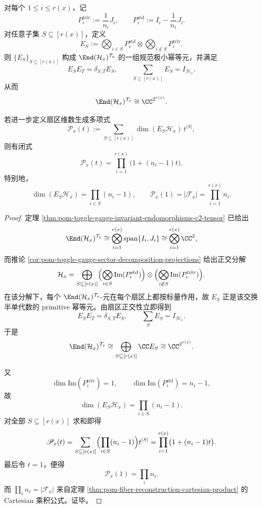 \begin{theorem}[开关不变代数的布尔谱与扇区维数多项式]\label{thm:conclusion-fiber-toggle-boolean-spectrum-polynomial}
对每个 \(1\le i\le r(x)\)，记
\[
P_i^{\mathrm{triv}}:=\frac{1}{n_i}J_i,
\qquad
P_i^{\mathrm{std}}:=I_i-\frac{1}{n_i}J_i.
\]
对任意子集 \(S\subseteq [r(x)]\)，定义
\[
E_S:=
\bigotimes_{i\in S}P_i^{\mathrm{std}}
\otimes
\bigotimes_{i\notin S}P_i^{\mathrm{triv}}.
\]
则 \(\{E_S\}_{S\subseteq[r(x)]}\) 构成 \(\End(\mathcal H_x)^{\mathcal T_x}\) 的一组规范极小幂等元，并满足
\[
E_SE_T=\delta_{S,T}E_S,
\qquad
\sum_{S\subseteq[r(x)]}E_S=I_{\mathcal H_x}.
\]
从而
\[
\End(\mathcal H_x)^{\mathcal T_x}\cong \CC^{2^{r(x)}}.
\]

若进一步定义扇区维数生成多项式
\[
\mathscr P_x(t):=\sum_{S\subseteq[r(x)]}\dim(E_S\mathcal H_x)\,t^{|S|},
\]
则有闭式
\[
\mathscr P_x(t)=\prod_{i=1}^{r(x)}\bigl(1+(n_i-1)t\bigr).
\]
特别地，
\[
\dim(E_S\mathcal H_x)=\prod_{i\in S}(n_i-1),
\qquad
\mathscr P_x(1)=|\mathcal F_x|=\prod_{i=1}^{r(x)}n_i.
\]
\end{theorem}
\begin{proof}
定理 \ref{thm:pom-toggle-gauge-invariant-endomorphisms-c2-tensor} 已给出
\[
\End(\mathcal H_x)^{\mathcal T_x}
\cong
\bigotimes_{i=1}^{r(x)}\mathrm{span}\{I_i,J_i\}
\cong
\bigotimes_{i=1}^{r(x)}\CC^2,
\]
而推论 \ref{cor:pom-toggle-gauge-sector-decomposition-projections} 给出正交分解
\[
\mathcal H_x
=
\bigoplus_{S\subseteq[r(x)]}
\Bigl(\bigotimes_{i\in S}\mathrm{Im}(P_i^{\mathrm{std}})\Bigr)
\otimes
\Bigl(\bigotimes_{i\notin S}\mathrm{Im}(P_i^{\mathrm{triv}})\Bigr).
\]
在该分解下，每个 \(\End(\mathcal H_x)^{\mathcal T_x}\)-元在每个扇区上都按标量作用，故 \(E_S\) 正是该交换半单代数的 primitive 幂等元。由扇区正交性立即得到
\[
E_SE_T=\delta_{S,T}E_S,
\qquad
\sum_{S}E_S=I_{\mathcal H_x}.
\]
于是
\[
\End(\mathcal H_x)^{\mathcal T_x}\cong \bigoplus_{S\subseteq[r(x)]}\CC E_S\cong \CC^{2^{r(x)}}.
\]

又
\[
\dim \mathrm{Im}(P_i^{\mathrm{triv}})=1,
\qquad
\dim \mathrm{Im}(P_i^{\mathrm{std}})=n_i-1,
\]
故
\[
\dim(E_S\mathcal H_x)=\prod_{i\in S}(n_i-1).
\]
对全部 \(S\subseteq[r(x)]\) 求和即得
\[
\mathscr P_x(t)
=
\sum_{S\subseteq[r(x)]}\Bigl(\prod_{i\in S}(n_i-1)\Bigr)t^{|S|}
=
\prod_{i=1}^{r(x)}\bigl(1+(n_i-1)t\bigr).
\]
最后令 \(t=1\)，便得
\[
\mathscr P_x(1)=\prod_i n_i.
\]
而 \(\prod_i n_i=|\mathcal F_x|\) 来自定理 \ref{thm:pom-fiber-reconstruction-cartesian-product} 的 Cartesian 乘积公式。证毕。
\end{proof}

